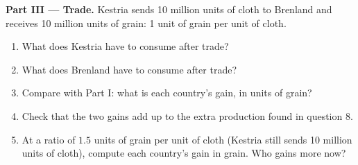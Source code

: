 \begin{problem}
\medskip
\noindent\textbf{Part III --- Trade.} Kestria sends 10 million units of cloth to Brenland
and receives 10 million units of grain: 1 unit of grain per unit of cloth.
\begin{enumerate}[resume]
  \item What does Kestria have to consume after trade?
  \item What does Brenland have to consume after trade?
  \item Compare with Part I: what is each country's gain, in units of grain?
  \item Check that the two gains add up to the extra production found in question 8.
  \item At a ratio of $1.5$ units of grain per unit of cloth (Kestria still sends 10 million
        units of cloth), compute each country's gain in grain. Who gains more now?
\end{enumerate}
\end{problem}
